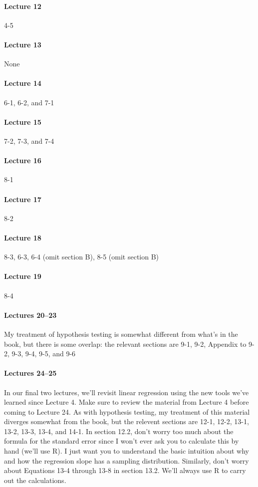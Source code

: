 \documentclass[12pt]{article}
\begin{document}
\paragraph{Lecture 12} 4-5
\paragraph{Lecture 13} None
\paragraph{Lecture 14} 6-1, 6-2, and 7-1
\paragraph{Lecture 15} 7-2, 7-3, and 7-4
\paragraph{Lecture 16} 8-1
\paragraph{Lecture 17} 8-2
\paragraph{Lecture 18} 8-3, 6-3, 6-4 (omit section B), 8-5 (omit section B)
\paragraph{Lecture 19} 8-4
\paragraph{Lectures 20--23} My treatment of hypothesis testing is somewhat different from what's in the book, but there is some overlap: the relevant sections are 9-1, 9-2, Appendix to 9-2, 9-3, 9-4, 9-5, and 9-6
\paragraph{Lectures 24--25} 
In our final two lectures, we'll revisit linear regression using the new tools we've learned since Lecture 4. 
Make sure to review the material from Lecture 4 before coming to Lecture 24. 
As with hypothesis testing, my treatment of this material diverges somewhat from the book, but the relevent sections are 12-1, 12-2, 13-1, 13-2, 13-3, 13-4, and 14-1. 
In section 12.2, don't worry too much about the formula for the standard error since I won't ever ask you to calculate this by hand (we'll use R). 
I just want you to understand the basic intuition about why and how the regression slope has a sampling distribution.
Similarly, don't worry about Equations 13-4 through 13-8 in section 13.2. 
We'll always use R to carry out the calculations.
\end{document}
